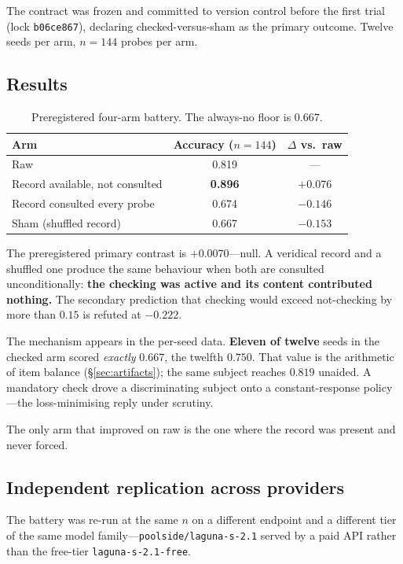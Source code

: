 \documentclass[11pt]{article}
\begin{document}
The contract was frozen and committed to version control before the first
trial (lock \texttt{b06ce867}), declaring checked-versus-sham as the primary
outcome. Twelve seeds per arm, $n=144$ probes per arm.

\subsection{Results}

\begin{table}[h]
\centering
\begin{tabular}{lcc}
\toprule
Arm & Accuracy ($n{=}144$) & $\Delta$ vs.\ raw \\
\midrule
Raw & 0.819 & --- \\
Record available, not consulted & \textbf{0.896} & $+0.076$ \\
Record consulted every probe & 0.674 & $-0.146$ \\
Sham (shuffled record) & 0.667 & $-0.153$ \\
\bottomrule
\end{tabular}
\caption{Preregistered four-arm battery. The always-no floor is $0.667$.}
\end{table}

\noindent
The preregistered primary contrast is $\mathbf{+0.0070}$---null. A veridical
record and a shuffled one produce the same behaviour when both are consulted
unconditionally: \textbf{the checking was active and its content contributed
nothing.} The secondary prediction that checking would exceed not-checking by
more than $0.15$ is refuted at $\mathbf{-0.222}$.

The mechanism appears in the per-seed data. \textbf{Eleven of twelve} seeds in
the checked arm scored \emph{exactly} $0.667$, the twelfth $0.750$. That value
is the arithmetic of item balance (\S\ref{sec:artifacts}); the same subject
reaches $0.819$ unaided. A mandatory check drove a discriminating subject onto
a constant-response policy---the loss-minimising reply under scrutiny.

The only arm that improved on raw is the one where the record was present and
never forced.

\subsection{Independent replication across providers}

The battery was re-run at the same $n$ on a different endpoint and a different
tier of the same model family---\texttt{poolside/laguna-s-2.1} served by a paid
API rather than the free-tier \texttt{laguna-s-2.1-free}.
\end{document}
